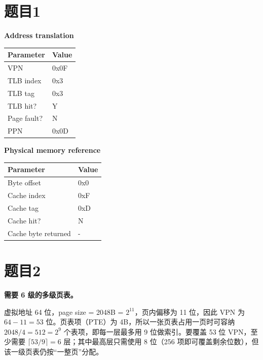 \documentclass[fleqn]{ctexart}
\begin{document}
\section*{题目1}

\noindent\textbf{Address translation}

\begin{center}
\begin{tabular}{|p{}|p{}|}
\hline
\textbf{Parameter} & \textbf{Value} \\
\hline
VPN & 0x0F\\
\hline
TLB index & 0x3\\
\hline
TLB tag & 0x3\\
\hline
TLB hit? & Y\\
\hline
Page fault? & N\\
\hline
PPN & 0x0D\\
\hline
\end{tabular}
\end{center}

\vspace{6mm}

\noindent\textbf{Physical memory reference}

\begin{center}
\begin{tabular}{|p{}|p{}|}
\hline
\textbf{Parameter} & \textbf{Value} \\
\hline
Byte offset & 0x0 \\
\hline
Cache index & 0xF \\
\hline
Cache tag & 0xD\\
\hline
Cache hit? & N\\
\hline
Cache byte returned & -\\
\hline
\end{tabular}
\end{center}

\section*{题目2}

\noindent\textbf{需要 6 级的多级页表。}

\noindent 虚拟地址 64 位，page size = 2048B = $2^{11}$，页内偏移为 11 位，因此 VPN 为 $64-11=53$ 位。页表项（PTE）为 4B，所以一张页表占用一页时可容纳 $2048/4=512=2^9$ 个表项，即每一层最多用 9 位做索引。要覆盖 53 位 VPN，至少需要 $\lceil 53/9 \rceil=6$ 层；其中最高层只需使用 8 位（256 项即可覆盖剩余位数），但该一级页表仍按“一整页”分配。
\end{document}
